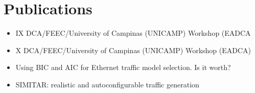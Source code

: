 \chapter{Publications}
\label{ap:publications}

\begin{itemize}
	\item IX DCA/FEEC/University of Campinas (UNICAMP) Workshop (EADCA
	\item X DCA/FEEC/University of Campinas (UNICAMP) Workshop (EADCA)
	\item Using BIC and AIC for Ethernet traffic model selection. Is it worth?
	\item SIMITAR: realistic and autoconfigurable traffic generation
\end{itemize}










%


